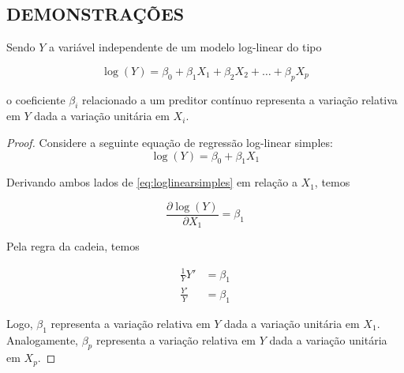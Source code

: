 \postextual

\begin{apendicesenv}
\partapendices

\chapter{DEMONSTRAÇÕES} \label{apendice_demonstracoes}

\begin{proposition}
  \label{proposicao1}

  Sendo $Y$ a variável independente de um modelo log-linear do tipo
  
  \begin{equation}
    \log(Y) = \beta_0 + \beta_1X_1 + \beta_2X_2 + \ldots + \beta_pX_p
  \end{equation} \label{eq:loglinear}
  
  \noindent o coeficiente $\beta_i$ relacionado a um preditor contínuo representa a variação relativa em $Y$ dada a variação unitária em $X_i$.

\end{proposition}

\begin{proof}
  Considere a seguinte equação de regressão log-linear simples:
  \begin{equation} \label{eq:loglinearsimples}
    \log(Y) = \beta_0 + \beta_1X_1
  \end{equation}

  Derivando ambos lados de \eqref{eq:loglinearsimples} em relação a $X_1$, temos

  \begin{equation} \label{eq:derivada1}
    \frac{\partial \log(Y)}{\partial X_1} = \beta_1
  \end{equation}

  Pela regra da cadeia, temos

  $$
  \begin{aligned}
    \frac{1}{Y}Y' &= \beta_1\\
    \frac{Y'}{Y} &= \beta_1
  \end{aligned}
  $$

  Logo, $\beta_1$ representa a variação relativa em $Y$ dada a variação unitária em $X_1$. Analogamente, $\beta_p$ representa a variação relativa em $Y$ dada a variação unitária em $X_p$.

\end{proof}


\end{apendicesenv}
